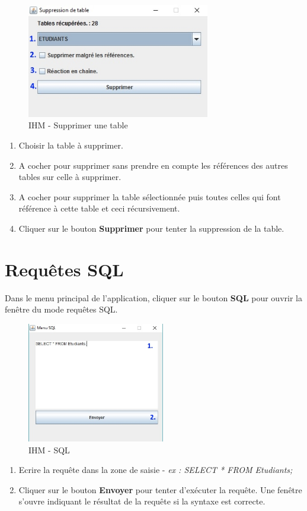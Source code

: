\begin{figure}[!h]
\centering
\includegraphics[width=8cm]{./images/manuel/supprimer_table.jpg}
\caption{IHM - Supprimer une table}
\label{supprimer_table}
\end{figure}

\begin{enumerate}
\item Choisir la table à supprimer.
\item A cocher pour supprimer sans prendre en compte les références des autres tables sur celle à supprimer.
\item A cocher pour supprimer la table sélectionnée puis toutes celles qui font référence à cette table et ceci récursivement.
\item Cliquer sur le bouton \textbf{Supprimer} pour tenter la suppression de la table.
\end{enumerate}

\section{Requ\^etes SQL}
Dans le menu principal de l'application, cliquer sur le bouton \textbf{SQL} pour ouvrir la fen\^etre du mode requ\^etes SQL.
\begin{figure}[!h]
\centering
\includegraphics[width=6cm]{./images/manuel/sql.jpg}
\caption{IHM - SQL}
\label{sql}
\end{figure}

\begin{enumerate}
\item Ecrire la requ\^ete dans la zone de saisie - \textit{ex : SELECT * FROM Etudiants;} 
\item Cliquer sur le bouton \textbf{Envoyer} pour tenter d'exécuter la requ\^ete.
Une fenêtre s'ouvre indiquant le résultat de la requ\^ete si la syntaxe est correcte.
\end{enumerate}

